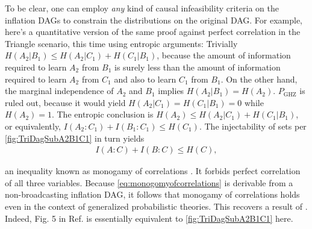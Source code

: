 {To be clear, one can employ \emph{any} kind of causal infeasibility criteria on the inflation DAGs to constrain the distributions on the original DAG. For example, here's a quantitative version of the same proof against perfect correlation in the Triangle scenario, this time using entropic arguments: Trivially $H(A_2|B_1)\leq H(A_2|C_1)+H(C_1|B_1)$, because the amount of information required to learn $A_2$ from $B_1$ is surely less than the amount of information required to learn  $A_2$ from $C_1$ and also to learn $C_1$ from $B_1$. On the other hand, the marginal independence of $A_2$ and $B_1$ implies $H(A_2|B_1)=H(A_2)$. $P_{\text{GHZ}}$ is ruled out, because it would yield $H(A_2|C_1)=H(C_1|B_1)=0$ while $H(A_2)=1$. The entropic conclusion is $H(A_2)\leq H(A_2|C_1)+H(C_1|B_1)$, or equivalently, $I(A_2:C_1)+I(B_1:C_1)\leq H(C_1)$. The injectability of sets per \cref{fig:TriDagSubA2B1C1} in turn yields
\begin{align}\label{eq:monogomyofcorrelations}
I(A:C)+I(B:C)\leq H(C),
\end{align}

an inequality known as monogamy of correlations \cite{fritz2012bell}. It forbids perfect correlation of all three variables. Because \cref{eq:monogomyofcorrelations} is derivable from a non-broadcasting inflation DAG, it follows that monogamy of correlations holds even in the context of generalized probabilistic theories. This recovers a result of \citet[Cor. 24]{pusey2014gdag}. Indeed, Fig. 5 in Ref. \cite{pusey2014gdag} is essentially equivalent to \cref{fig:TriDagSubA2B1C1} here.


}
